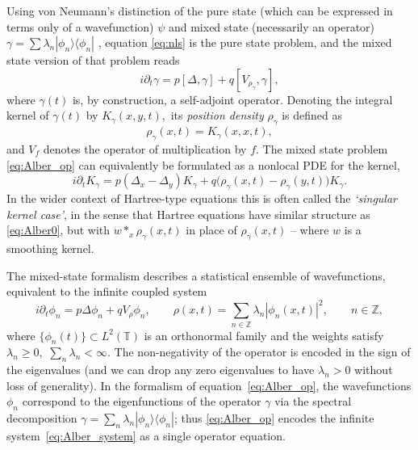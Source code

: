 \documentclass[11pt]{amsart}
\theoremstyle{definition}
\newcommand{\T}{\mathbb{T}}
\newcommand{\Z}{\mathbb{Z}}
\begin{document}
Using von Neumann's distinction of the pure state  (which can be expressed in terms only of a wavefunction) $\psi$ and mixed state (necessarily an operator) $\gamma=\sum\limits\lambda_n|\phi_n\rangle\langle\phi_n|$  \cite{vonNeumann1927}, equation  \eqref{eq:nls} is the pure state problem, and the mixed state version of that problem reads
\begin{equation}\label{eq:Alber_op}
  i\partial_t \gamma = p[\Delta,\gamma]
  + q[V_{\rho_\gamma},\gamma],
\end{equation}
where $\gamma(t)$ is, by construction, a self-adjoint operator. Denoting the integral  kernel of $\gamma(t)$ by $K_\gamma(x,y,t),$ its {\em position density} $\rho_\gamma$ is defined as
\begin{equation}\label{eq:def_posden}
\rho_\gamma(x,t)=K_\gamma(x,x,t),
\end{equation}
and $V_f$ denotes the operator of multiplication by $f$. The mixed state problem \eqref{eq:Alber_op} can equivalently be formulated as a nonlocal PDE for the kernel,
\begin{equation}\label{eq:Alber0}
  i\partial_t K_\gamma = p(\Delta_x - \Delta_y)K_\gamma
  + q\bigl(\rho_\gamma(x,t)-\rho_\gamma(y,t)\bigr)K_\gamma.
\end{equation}
In the wider context of Hartree-type equations this is often called the {\em `singular kernel case'}, in the sense that Hartree equations have similar structure as \eqref{eq:Alber0}, but with $w\ast_x \rho_\gamma(x,t)$ in place of $\rho_\gamma(x,t)$ -- where $w$ is a  smoothing kernel.

The mixed-state formalism describes a statistical ensemble of wavefunctions, equivalent to the infinite coupled system
\begin{equation}\label{eq:Alber_system}
  i\partial_t \phi_n = p\Delta \phi_n + qV_\rho \phi_n,
  \qquad
  \rho(x,t) = \sum_{n\in\Z} \lambda_n |\phi_n(x,t)|^2,
  \qquad n\in\Z,
\end{equation}
where $\{\phi_n(t)\}\subset L^2(\T)$ is an orthonormal family and the weights satisfy $\lambda_n\ge 0,$ $\sum_n\lambda_n<\infty$. The non-negativity of the operator is encoded in the sign of the eigenvalues (and we can drop any zero eigenvalues to have  $\lambda_n> 0$ without loss of generality).  In the formalism of equation~\eqref{eq:Alber_op}, the wavefunctions $\phi_n$ correspond to the eigenfunctions of the operator $\gamma$ via the spectral decomposition $\gamma=\sum_n\lambda_n|\phi_n\rangle\langle\phi_n|$; thus \eqref{eq:Alber_op} encodes the infinite system~\eqref{eq:Alber_system} as a single operator equation.
\end{document}
